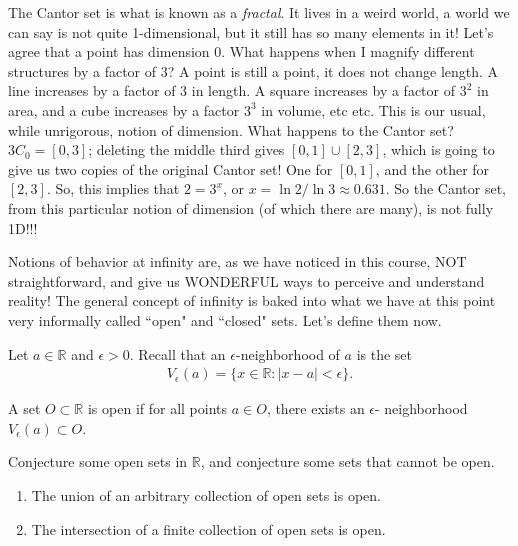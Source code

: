 \documentclass{ximera}
\begin{document}
The Cantor set is what is known as a \textit{fractal}.  It lives in a weird world, a world we can say is not quite 1-dimensional, but it still has so many elements in it!  Let's agree that a point has dimension $0$.  What happens when I magnify different structures by a factor of $3$? A point is still a point, it does not change length.  A line increases by a factor of $3$ in length.  A square increases by a factor of $3^2$ in area, and a cube increases by a factor $3^3$ in volume, etc etc.  This is our usual, while unrigorous, notion of dimension.  What happens to the Cantor set?  $3C_0 = [0,3]$; deleting the middle third gives $[0,1]\cup[2,3]$, which is going to give us two copies of the original Cantor set! One for $[0,1]$, and the other for $[2,3]$.  So, this implies that $2 = 3^x$, or $x =  \ln{2}/\ln{3} \approx 0.631$.  So the Cantor set, from this particular notion of dimension (of which there are many), is not fully 1D!!!


Notions of behavior at infinity are, as we have noticed in this course, NOT straightforward, and give us WONDERFUL ways to perceive and understand reality!  The general concept of infinity is baked into what we have at this point very informally called ``open" and ``closed" sets. Let's define them now.

Let $a \in \mathbb{R}$ and $\epsilon > 0$.  Recall that an $\epsilon$-neighborhood of $a$ is the set
\begin{align*}
    V_{\epsilon}(a) = \{x \in \mathbb{R}:|x-a|<\epsilon\}.
\end{align*}

\begin{definition}
    A set $O\subset\mathbb{R}$ is open if for all points $a \in O$, there exists an $\epsilon$- neighborhood $ V_{\epsilon}(a)  \subset{O}$.
\end{definition}

\begin{exercise}
    Conjecture some open sets in $\mathbb{R}$, and conjecture some sets that cannot be open.
\end{exercise}

\begin{theorem}
    \begin{enumerate}
        \item The union of an arbitrary collection of open sets is open.
        \item The intersection of a finite collection of open sets is open.
    \end{enumerate}
\end{theorem}
\end{document}
